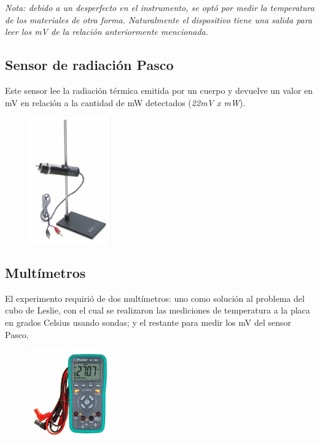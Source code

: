 \documentclass[a4paper]{article}
\begin{document}
            \indent \textit{Nota: debido a un desperfecto en el instrumento, se optó por medir la temperatura de los materiales de otra forma. Naturalmente el dispositivo tiene una salida para leer los mV de la relación anteriormente mencionada.}
        \subsection{Sensor de radiación Pasco}
            \indent Este sensor lee la radiación térmica emitida por un cuerpo y devuelve un valor en mV en relación a la cantidad de mW detectados (\textit{22mV x mW}). \\
            
            \begin{figure}[h!]
            	\centering
            	\includegraphics[width =3.5cm]{./sensorPasco.png}
            \end{figure}
            	
        \subsection{Multímetros}
            \indent El experimento requirió de dos multímetros: uno como solución al problema del cubo de Leslie, con el cual se realizaron las mediciones de temperatura a la placa en grados Celsius usando sondas; y el restante para medir los mV del sensor Pasco.
            
            \begin{figure}[h!]
            	\centering
            	\includegraphics[width =3.5cm]{./multimetro.png}
            \end{figure}
               
\end{document}
